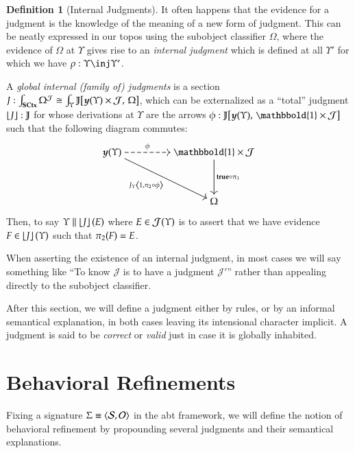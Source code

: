 \documentclass[11pt]{article}
\theoremstyle{definition}
\newtheorem{definition}[thm]{Definition}
\theoremstyle{remark}
\numberwithin{equation}{section}
\def\IModeColorName{MidnightBlue}
\def\OModeColorName{Maroon}
\def\IModeColorName{Black}
\def\OModeColorName{Black}
\newcommand\IMode[1]{{\color{\IModeColorName}{#1}}}
\newcommand\OMode[1]{{\color{\OModeColorName}{#1}}}
\newcommand\Member[2]{\IMode{#1}\in\IMode{#2}}
\newcommand\Of[2]{\IMode{#1}: \IMode{#2}}
\newcommand\Match[2]{\IMode{#1}\equiv\OMode{#2}}
\newcommand\Sorts{\mathcal{S}}
\newcommand\Operators{\mathcal{O}}
\newcommand\SCtx{\mathbf{SCtx}}
\newcommand\Pair[2]{\left\langle#1, #2 \right\rangle}
\newcommand\Hom[3]{#1\!\left[#2,\,#3\right]}
\newcommand\IsEq[2]{\IMode{#1} = \IMode{#2}}
\newcommand\Embed[1]{\left\lfloor#1\right\rfloor}
\newcommand\Yoneda[1]{\boldsymbol{y} (#1)}
\begin{document}
\begin{definition}[Internal Judgments]

  It often happens that the evidence for a judgment is the knowledge of the
  meaning of a new form of judgment. This can be neatly expressed in our topos
  using the subobject classifier $\Omega$, where the evidence of $\Omega$ at
  $\Upsilon$ gives rise to an \emph{internal judgment} which is defined at all
  $\Upsilon'$ for which we have $\Of{\rho}{\Upsilon\inj\Upsilon'}$.

  A \emph{global internal (family of) judgments} is a section
  $\Of{J}{\int_\SCtx {\Omega^{\mathcal{J}}}}\cong
  \IMode{\int_\Upsilon\Hom{\mathbb{J}}{\Yoneda{\Upsilon}\times\mathcal{J}}{\Omega}}$,
  which can be externalized as a ``total'' judgment $\Of{\Embed{J}}{\mathbb{J}}$
  for whose derivations at $\Upsilon$ are the arrows
  $\Of{\phi}{\Hom{\mathbb{J}}{\Yoneda{\Upsilon}}{\mathbbold{1}\times\mathcal{J}}}$
  such that the following diagram commutes:
  \[
    \begin{tikzcd}[cramped,sep=huge]
      \IMode{\Yoneda{\Upsilon}}
        \arrow[r, dashed, "\OMode{\phi}"]
        \arrow[rd, "\IMode{J_\Upsilon\Pair{1}{\pi_2\circ\phi}}"']
      & \IMode{\mathbbold{1}\times\mathcal{J}} \arrow[d, "\IMode{\mathbf{true}\circ\pi_1}"] \\
      & \IMode{\Omega}
    \end{tikzcd}
  \]

  Then, to say $\IMode{\Upsilon}\parallel\Embed{J}(E)$ where
  $\Member{E}{\mathcal{J}(\Upsilon)}$ is to assert that we have evidence
  $\Member{F}{\Embed{J}(\Upsilon)}$ such that $\IsEq{\pi_2(F)}{E}$.

  When asserting the existence of an internal judgment, in most cases we will
  say something like ``To know $\mathcal{J}$ is to have a judgment
  $\mathcal{J'}$'' rather than appealing directly to the subobject classifier.
\end{definition}

After this section, we will define a judgment either by rules, or by an
informal semantical explanation, in both cases leaving its intensional
character implicit. A judgment is said to be \emph{correct} or \emph{valid}
just in case it is globally inhabited.

\section{Behavioral Refinements}

Fixing a signature $\Match{\Sigma}{\Pair{\Sorts}{\Operators}}$ in the abt
framework, we will define the notion of behavioral refinement by propounding
several judgments and their semantical explanations.
\end{document}
